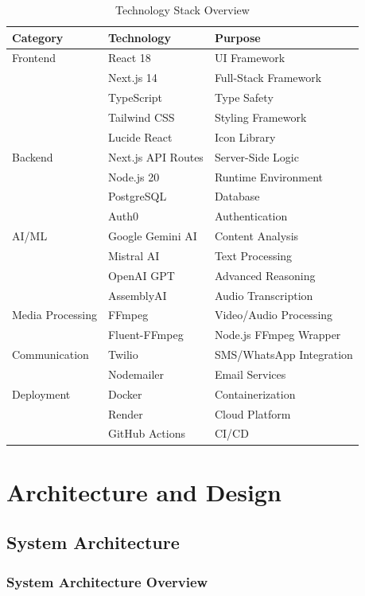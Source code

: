 \documentclass[12pt,a4paper]{article}
\begin{document}
\begin{table}[H]
\centering
\caption{Technology Stack Overview}
\label{tab:tech-stack}
\begin{tabular}{@{}lll@{}}
\toprule
\textbf{Category} & \textbf{Technology} & \textbf{Purpose} \\
\midrule
Frontend & React 18 & UI Framework \\
& Next.js 14 & Full-Stack Framework \\
& TypeScript & Type Safety \\
& Tailwind CSS & Styling Framework \\
& Lucide React & Icon Library \\
\midrule
Backend & Next.js API Routes & Server-Side Logic \\
& Node.js 20 & Runtime Environment \\
& PostgreSQL & Database \\
& Auth0 & Authentication \\
\midrule
AI/ML & Google Gemini AI & Content Analysis \\
& Mistral AI & Text Processing \\
& OpenAI GPT & Advanced Reasoning \\
& AssemblyAI & Audio Transcription \\
\midrule
Media Processing & FFmpeg & Video/Audio Processing \\
& Fluent-FFmpeg & Node.js FFmpeg Wrapper \\
\midrule
Communication & Twilio & SMS/WhatsApp Integration \\
& Nodemailer & Email Services \\
\midrule
Deployment & Docker & Containerization \\
& Render & Cloud Platform \\
& GitHub Actions & CI/CD \\
\bottomrule
\end{tabular}
\end{table}

\section{Architecture and Design}

\subsection{System Architecture}

\subsubsection{System Architecture Overview}
\end{document}
